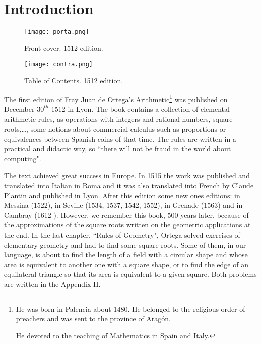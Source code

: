 \documentclass{amsart}
\begin{document}
\maketitle

 \section{Introduction}
  \begin{center}
\begin{figure}
\texttt{[image: porta.png]}
\caption{Front cover. 1512 edition.}
\vspace*{1cm}
\end{figure}
\begin{figure}
\texttt{[image: contra.png]}
\caption{Table of Contents.  1512 edition.}
\end{figure}
\end{center}

 The first edition of Fray Juan de Ortega's Arithmetic\footnote{ He was born in Palencia about 1480. He belonged to the religious order of preachers and was sent to the province of Arag\'on.

 He devoted to the teaching of Mathematics in Spain and Italy.} was published on December $30^{th}$ 1512 in Lyon. The book contains a collection of elemental arithmetic rules, as operations with integers and rational numbers, square roots,\ldots, some notions  about commercial calculus such as proportions or equivalences between Spanish coins of that time.
  The rules are written in a
  practical and didactic way, so ``there will not be fraud in the world about computing".

The text achieved great success in Europe. In 1515 the work was published and translated into Italian in Roma and it was also translated into French by Claude Plantin and published in Lyon.  After this edition some new ones editions: in Messina (1522), in Seville (1534, 1537, 1542, 1552), in Grenade (1563) and in Cambray (1612 ). However, we remember this book, 500 years later, because of the approximations of the square roots written on the geometric applications at the end. In the last chapter, ``Rules of Geometry", Ortega solved exercises of elementary geometry and had to find some square roots. Some of them, in our language, is about to find the length of a field with a circular shape and whose area is equivalent to another one with a square shape, or to find the edge of an equilateral triangle so that its area is equivalent to a given square. Both problems are written in the Appendix II.
\end{document}

